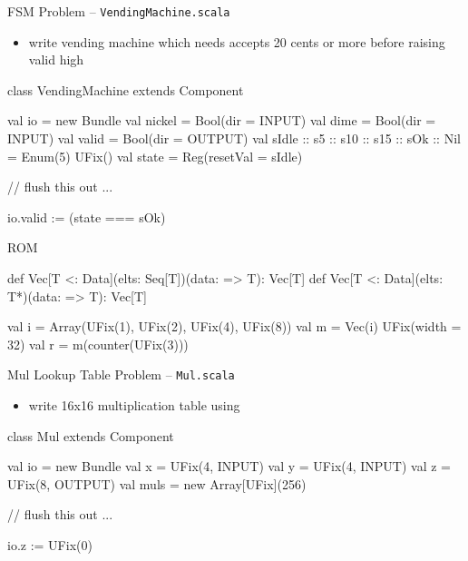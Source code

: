 \documentclass[xcolor=pdflatex,dvipsnames,table]{beamer}
\begin{document}
\begin{frame}[fragile]{FSM Problem -- \tt VendingMachine.scala}
\begin{itemize}
\item write vending machine which needs accepts 20 cents or more before raising valid high
\end{itemize}
\begin{scala}
class VendingMachine extends Component {
  val io = new Bundle {
    val nickel = Bool(dir = INPUT)
    val dime   = Bool(dir = INPUT)
    val valid  = Bool(dir = OUTPUT) }
  val sIdle :: s5 :: s10 :: s15 :: sOk :: Nil = Enum(5){ UFix() }
  val state = Reg(resetVal = sIdle)

  // flush this out ...

  io.valid := (state === sOk)
}
\end{scala}
\end{frame}

\begin{frame}[fragile]{ROM}

\begin{scala}
def Vec[T <: Data](elts: Seq[T])(data: => T): Vec[T]
def Vec[T <: Data](elts: T*)(data: => T): Vec[T]
\end{scala}

\begin{scala}
val i = Array(UFix(1), UFix(2), UFix(4), UFix(8))
val m = Vec(i){ UFix(width = 32) }
val r = m(counter(UFix(3)))
\end{scala}

% 

\end{frame}

\begin{frame}[fragile]{Mul Lookup Table Problem -- \tt Mul.scala}
\begin{itemize}
\item write 16x16 multiplication table using 
\end{itemize}
\begin{scala}
class Mul extends Component {
  val io = new Bundle {
    val x   = UFix(4, INPUT)
    val y   = UFix(4, INPUT)
    val z   = UFix(8, OUTPUT)
  }
  val muls = new Array[UFix](256)

  // flush this out ...

  io.z := UFix(0)
}
\end{scala}

\end{frame}
\end{document}
